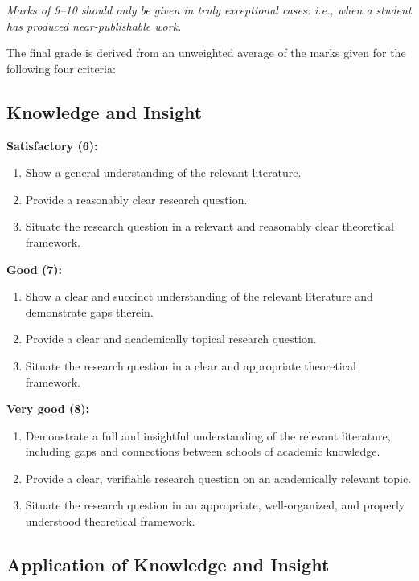 \documentclass[11pt,a4paper]{article}
\begin{document}
\textit{Marks of 9--10 should only be given in truly exceptional cases: i.e., when a student has produced near-publishable work.}

The final grade is derived from an unweighted average of the marks given for the following four criteria:

\subsection{Knowledge and Insight}

\textbf{Satisfactory (6):}
\begin{enumerate}[label=\Alph*.]
    \item Show a general understanding of the relevant literature.
    \item Provide a reasonably clear research question.
    \item Situate the research question in a relevant and reasonably clear theoretical framework.
\end{enumerate}

\textbf{Good (7):}
\begin{enumerate}[label=\Alph*.]
    \item Show a clear and succinct understanding of the relevant literature and demonstrate gaps therein.
    \item Provide a clear and academically topical research question.
    \item Situate the research question in a clear and appropriate theoretical framework.
\end{enumerate}

\textbf{Very good (8):}
\begin{enumerate}[label=\Alph*.]
    \item Demonstrate a full and insightful understanding of the relevant literature, including gaps and connections between schools of academic knowledge.
    \item Provide a clear, verifiable research question on an academically relevant topic.
    \item Situate the research question in an appropriate, well-organized, and properly understood theoretical framework.
\end{enumerate}

\subsection{Application of Knowledge and Insight}
\end{document}
